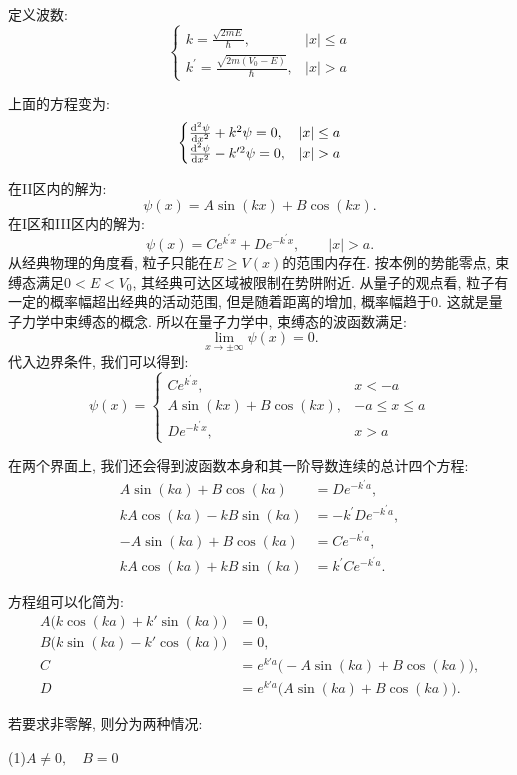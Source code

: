 定义波数:
\[
\begin{cases}
k = \frac{\sqrt{2mE}}{\hbar}, & |x| \leq a \\
k^{\prime} = \frac{\sqrt{2m(V_0-E)}}{\hbar}, & |x|>a
\end{cases}
\]

上面的方程变为:
\[
\begin{cases}
\frac{\d ^2 \psi}{\d x^2}+k^2\psi = 0, & |x| \leq a \\
\frac{\d ^2 \psi}{\d x^2}-k^{\prime 2}\psi = 0, & |x|>a
\end{cases}
\]

在II区内的解为:
\[
\psi(x) = A\sin(kx)+B\cos(kx).
\]
在I区和III区内的解为:
\[
\psi(x) = Ce^{k^{\prime}x} + De^{-k^{\prime}x}, \qquad |x|>a.
\]
从经典物理的角度看, 粒子只能在$E\geq V(x)$的范围内存在. 按本例的势能零点, 束缚态满足$0<E<V_0$, 其经典可达区域被限制在势阱附近. 从量子的观点看, 粒子有一定的概率幅超出经典的活动范围, 但是随着距离的增加, 概率幅趋于$0$. 这就是量子力学中束缚态的概念. 所以在量子力学中, 束缚态的波函数满足:
\[
\lim_{x\to \pm \infty} \psi(x) = 0.
\]
代入边界条件, 我们可以得到:
\[
\psi(x) = \begin{cases}
Ce^{k^{\prime}x}, & x < -a \\
A\sin(kx)+B\cos(kx), & -a \leq x \leq a \\
De^{-k^{\prime}x}, & x > a
\end{cases}
\]

在两个界面上, 我们还会得到波函数本身和其一阶导数连续的总计四个方程:
\[
\begin{aligned}
A\sin(ka) + B\cos(ka) &= De^{-k^{\prime}a}, \\
kA\cos(ka) - kB\sin(ka) &= -k^{\prime}De^{-k^{\prime}a}, \\
-A\sin(ka) + B\cos(ka) &= Ce^{-k^{\prime}a}, \\
kA\cos(ka) + kB\sin(ka) &= k^{\prime}Ce^{-k^{\prime}a}.
\end{aligned}
\]

方程组可以化简为:
\[
\begin{aligned}
A\bigl(k\cos(ka)+k'\sin(ka)\bigr)&=0, \\
B\bigl(k\sin(ka)-k'\cos(ka)\bigr)&=0, \\
C&=e^{k'a}\bigl(-A\sin(ka)+B\cos(ka)\bigr), \\
D&=e^{k'a}\bigl(A\sin(ka)+B\cos(ka)\bigr).
\end{aligned}
\]

若要求非零解, 则分为两种情况:

(1)$A\neq 0, \quad B=0$

